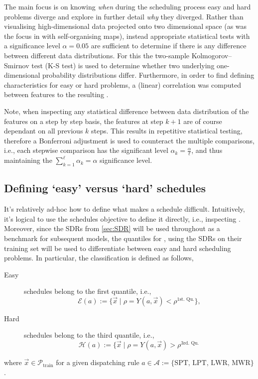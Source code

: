 The main focus is on knowing \emph{when} during the scheduling process easy and hard problems diverge and explore in further detail \emph{why} they diverged. Rather than visualising high-dimensional data projected onto two dimensional space (as was the focus in \cite{SmithMilesLion5} with self-organising maps), instead appropriate statistical tests with a significance level $\alpha=0.05$ are sufficient to determine if there is any difference between different data distributions. For this the two-sample Kolmogorov–Smirnov test (K-S test) is used to determine whether two underlying one-dimensional probability distributions differ. 
Furthermore, in order to find defining characteristics for easy or hard problems, a (linear) correlation was computed between features to the resulting \namerho.

Note, when inspecting any statistical difference between data distribution of the features on a step by step basis, the features at step $k+1$ are of course dependant on all previous $k$ steps. This results in repetitive statistical testing, therefore a Bonferroni adjustment is used to counteract the multiple comparisons, i.e., each stepwise comparison has the significant level $\alpha_k=\frac{\alpha}{\ell}$, and thus maintaining the $\sum_{k=1}^{\ell}\alpha_k=\alpha$ significance level.

\subsection{Defining `easy' versus `hard' schedules}\label{sec:diff:easyhard}
It's relatively ad-hoc how to define what makes a schedule difficult. Intuitively, it's logical to use the schedules objective to define it directly, i.e., inspecting \fullnamerho. Moreover, since the SDRs from \cref{sec:SDR} will be used throughout as a benchmark for subsequent models, the quantiles for \namerho, using the SDRs on their training set will be used to differentiate between easy and hard scheduling problems. In particular, the classification is defined as follows, 
\begin{description}
\item[Easy] schedules belong to the first quantile, i.e., \hfill \\
\begin{equation}\label{eq:easy}
\mathcal{E}(a):=\{\vec{x}\;|\;\rho=Y(a,\vec{x})<\rho^{\text{1st. Qu.}}\},
\end{equation} 
\item[Hard] schedules belong to the third quantile, i.e., \hfill \\
\begin{equation}\label{eq:hard}
\mathcal{H}(a):=\{\vec{x}\;|\;\rho=Y(a,\vec{x})>\rho^{\text{3rd. Qu.}}\,
\end{equation} 
\end{description}
where $\vec{x}\in\mathcal{P}_{\text{train}}$ for a given dispatching rule $a\in\mathcal{A}:=\{\text{SPT,~LPT,~LWR,~MWR}\}$.

